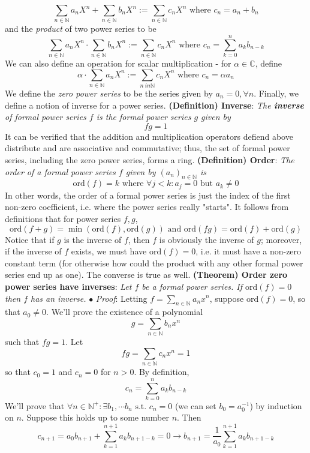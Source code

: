 \documentclass{article}
\newcommand*{\tb}{\textbf}
\newcommand*{\ti}{\textit}
\newcommand*{\n}{\newline}
\newcommand*{\nn}{\newline \newline}
\newcommand*{\Pf}{\indent \ensuremath{\bullet} \textit{Proof}: }
\newcommand*{\N}{\mathbb{N}}
\newcommand*{\C}{\mathbb{C}}
\newcommand*{\st}{\text{ s.t. }}
\begin{document}
    $$ \sum_{n \in \N} a_n X^n + \sum_{n \in \N} b_n X^n := \sum_{n \in \N} c_n X^n \text{ where } c_n = a_n + b_n $$
and the \ti{product} of two power series to be
    $$ \sum_{n \in \N} a_n X^n \cdot \sum_{n \in \N} b_n X^n := \sum_{n \in \N} c_n X^n \text{ where } c_n = \sum_{k = 0}^n a_k b_{n - k} $$
We can also define an operation for scalar multiplication - for $ \alpha \in \C $, define
    $$ \alpha \cdot \sum_{n \in \N} a_n X^n := \sum_{n \ in \N} c_n X^n \text{ where } c_n = \alpha a_n $$
We define the \ti{zero power series} to be the series given by $ a_n = 0, \forall n $. Finally, we define a notion of inverse for a power series.
\nn
\tb{(Definition) Inverse}: \ti{The \tb{inverse} of formal power series $ f $ is the formal power series $ g $ given by}
    $$ f g = 1 $$
It can be verified that the addition and multiplication operators defiend above distribute and are associative and commutative; thus, the set of formal power series, including the zero power series, forms a ring.
\nn
\tb{(Definition) Order}: \ti{The order of a formal power series $ f $ given by $ ( a_n )_{n \in \N} $ is}
    $$ \text{ord}(f) = k \text{ where } \forall j < k: a_j = 0 \text{ but } a_k \neq 0 $$
In other words, the order of a formal power series is just the index of the first non-zero coefficient, i.e. where the power series really "starts". It follows from definitions that for power series $ f, g $,
    $$ \text{ord}(f + g) = \min(\text{ord}(f), \text{ord}(g)) \text{ and } \text{ord}(f g) = \text{ord}(f) + \text{ord}(g) $$
Notice that if $ g $ is the inverse of $ f $, then $ f $ is obviously the inverse of $ g $; moreover, if the inverse of $ f $ exists, we must have $ \text{ord}(f) = 0 $, i.e. it must have a non-zero constant term (for otherwise how could the product with any other formal power series end up as one). The converse is true as well.
\nn
\tb{(Theorem) Order zero power series have inverses}: \ti{Let $ f $ be a formal power series. If $ \text{ord}(f) = 0 $ then $ f $ has an inverse.}
\n
\Pf Letting $ f = \sum_{n \in \N} a_n x^n $, suppose $ \text{ord}(f) = 0 $, so that $ a_0 \neq 0 $. We'll prove the existence of a polynomial
    $$ g = \sum_{n \in \N} b_n x^n $$
such that $ f g = 1 $. Let
    $$ f g = \sum_{n \in \N} c_n x^n = 1 $$
so that $ c_0 = 1 $ and $ c_n = 0 $ for $ n > 0 $. By definition,
    $$ c_n = \sum_{k = 0}^n a_k b_{n - k} $$
We'll prove that $ \forall n \in \N^+: \exists b_1, \cdots b_n \st c_n = 0 $ (we can set $ b_0 = a_0^{-1} $) by induction on $ n $. Suppose this holds up to some number $ n $. Then
    $$ c_{n + 1} = a_0 b_{n + 1} + \sum_{k = 1}^{n + 1} a_k b_{n + 1 - k} = 0 \rightarrow b_{n + 1} = \frac{1}{a_0} \sum_{k = 1}^{n + 1} a_k b_{n + 1 - k} $$
\end{document}
